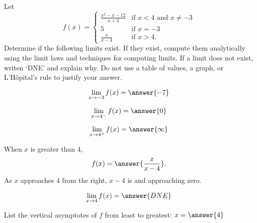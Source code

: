 \documentclass{ximera}
\begin{document}
\begin{exercise}


Let 
\[
f(x)=\begin{cases}
\frac{x^2-x-12}{x+3} & \text{if $x<4$ and $x\ne -3$}\\
5 & \text{if $x=-3$}\\
\frac{x}{x-4} & \text{if $x>4$}.
\end{cases}
\]
Determine if the following limits exist. If they exist, compute them
analytically using the limit laws and techniques for computing
limits. If a limit does not exist, writen `DNE' and explain why.  Do
not use a table of values, a graph, or L'H\^opital's rule to justify
your answer.
\begin{exercise}
  \[
  \lim_{x\to -3}f(x)=\answer{-7}
  \]
\end{exercise}
\begin{exercise}
  \[
  \lim_{x\to 4^{-}}f(x)=\answer{0}
  \]
\end{exercise}
\begin{exercise}
  \[
  \lim_{x\to 4^+}f(x)=\answer{\infty}
  \]
  \begin{exercise}
    When $x$ is greater than $4$,
    \[
    f(x) = \answer{\frac{x}{x-4}}.
    \]
    As $x$ approaches $4$ from the right, $x-4$ is  and approaching zero.
  \end{exercise}
\end{exercise}
\begin{exercise}
  \[
  \lim_{x\to 4}f(x)=\answer{DNE}
  \]   
\end{exercise}

List the vertical asymptotes of $f$ from least to greatest: $x=\answer{4}$


\end{exercise}
\end{document}
